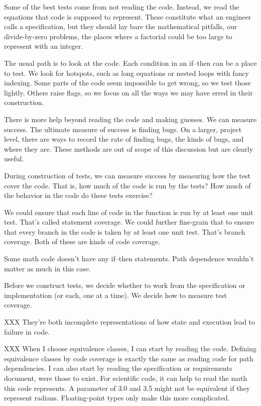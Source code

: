 \documentclass[fleqn,10pt]{olplainarticle}
\begin{document}
Some of the best tests come from not reading the code.
Instead, we read the equations that code is supposed to represent.
These constitute what an engineer calls a specification,
but they should lay bare the mathematical pitfalls, our
divide-by-zero problems, the places where a factorial
could be too large to represent with an integer.

The usual path is to look at the code. Each condition in
an if--then can be a place to test. We look for hotspots,
such as long equations or nested loops with fancy indexing.
Some parts of the code seem impossible to get wrong, so we
test those lightly. Others raise flags, so we focus on all the
ways we may have erred in their construction.

There is more help beyond reading the code and making
guesses. We can measure success. The ultimate measure
of success is finding bugs. On a larger, project level,
there are ways to record the rate of finding bugs, the kinds
of bugs, and where they are. These methods are out of scope
of this discussion but are clearly useful.

During construction of tests, we can measure success by
measuring how the test cover the code. That is, how much of
the code is run by the tests? How much of the behavior in the
code do these tests exercise?

We could ensure that each line of code in the function is
run by at least one unit test. That's called statement coverage.
We could further fine-grain that to ensure that every branch
in the code is taken by at least one unit test. That's
branch coverage. Both of these are kinds of code coverage.

Some math code doesn't have any if--then statements. Path
dependence wouldn't matter as much in this case.

Before we construct tests, we decide whether to work from
the specification or implementation (or each, one at a time).
We decide how to measure test coverage.



XXX They're both incomplete representations of how state and execution
lead to failure in code.

XXX When I choose equivalence classes, I can start by reading
the code. Defining equivalence classes by code coverage is
exactly the same as reading code for path dependencies.
I can also start by reading the specification or requirements
document, were those to exist. For scientific code,
it can help to read the math this code represents.
A parameter of 3.0 and 3.5 might not be equivalent if they
represent radians. Floating-point types only make this
more complicated.
\end{document}
